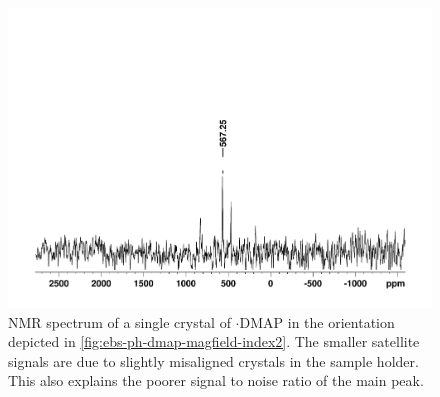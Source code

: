 \begin{refsection}
\begin{figure}
  \centering
  \includegraphics[width=0.8\linewidth]{Figures/ebs-dmap-hahnecho-77se2.pdf}
  \caption[ NMR spectrum of a single crystal of $\cdot$DMAP in the orientation depicted in \cref{fig:ebs-ph-dmap-magfield-index2}.]{ NMR spectrum of a single crystal of $\cdot$DMAP in the orientation depicted in \cref{fig:ebs-ph-dmap-magfield-index2}. The smaller satellite signals are due to slightly misaligned crystals in the sample holder. This also explains the poorer signal to noise ratio of the main peak.}
  \label{fig:ebs-dmap-hahnecho-77se2}
\end{figure}


\end{refsection}
